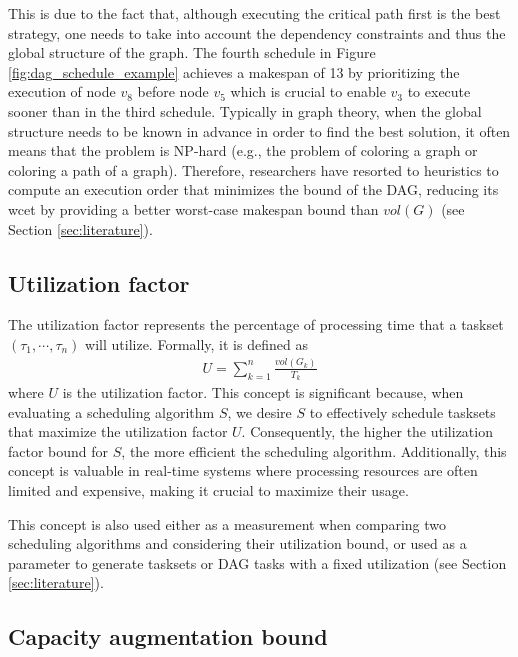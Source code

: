 This is due to the fact that, although executing the critical path first
is the best strategy\cite{zhao2020DAGsched}, 
one needs to take into account the dependency constraints
and thus the global structure of the graph.
The fourth schedule in Figure \ref{fig:dag_schedule_example}
achieves a makespan of 13 by prioritizing the execution of node $v_8$
before node $v_5$ which is crucial to enable $v_3$ to execute sooner
than in the third schedule.
Typically in graph theory, when the global structure needs to be known 
in advance
in order to find the best solution, it often means that the problem is NP-hard
(e.g., the problem of coloring a graph\cite{book1975richardNPhardColorGraph}
or coloring a path of a graph\cite{ERLEBACH2001ColorPathNPhard}).
Therefore, researchers have resorted to heuristics to compute an execution order
that minimizes the bound of the DAG, reducing its wcet 
by providing a better worst-case makespan bound than $vol(G)$ (see Section \ref{sec:literature}).


\subsection{Utilization factor}

The utilization factor represents the percentage of processing 
time that a taskset $(\tau_1, \cdots, \tau_n)$ will utilize. 
Formally, it is defined as
\begin{align}
U = \sum_{k=1}^{n} \frac{vol(G_k)}{T_k}
\end{align}
where $U$ is the utilization factor. This concept is significant 
because, when evaluating a scheduling algorithm $S$, we desire 
$S$ to effectively schedule tasksets that maximize the utilization 
factor $U$. Consequently, the higher the utilization factor bound 
for $S$, the more efficient the scheduling algorithm. Additionally, 
this concept is valuable in real-time systems where processing 
resources are often limited and expensive, making it crucial to 
maximize their usage.

This concept is also used either as a measurement
when comparing two scheduling algorithms 
and considering their utilization bound,
or used as a parameter to generate tasksets or DAG tasks with 
a fixed utilization (see Section \ref{sec:literature}).

\subsection{Capacity augmentation bound}

